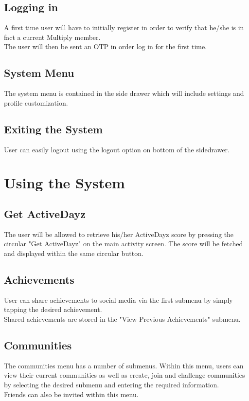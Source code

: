 \documentclass[11pt]{article}
\begin{document}
\subsection{Logging in}
A first time user will have to initially register in
order to verify that he/she is in fact a current Multiply member.\\
The user will then be sent an OTP in order log in for the first time.\\

\subsection{System Menu}
The system menu is contained in the side drawer which will include settings and profile customization.\\

\subsection{Exiting the System}
User can easily logout using the logout option on bottom of the sidedrawer.\\

\newpage
\section{Using the System}
\subsection{Get ActiveDayz}
The user will be allowed to retrieve his/her ActiveDayz score by pressing the circular "Get ActiveDayz" on the
main activity screen. The score will be fetched and displayed within the same circular button.\\
\subsection{Achievements}
User can share achievements to social media via the first submenu by simply tapping the desired achievement.\\
Shared achievements are stored in the "View Previous Achievements" submenu.\\
\subsection{Communities}
The communities menu has a number of submenus. Within this menu, users can view their current communities as well
as create, join and challenge communities by selecting the desired submenu and entering the required information.\\
Friends can also be invited within this menu.\\
\end{document}
